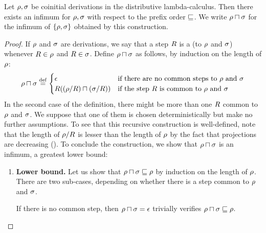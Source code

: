 \begin{proposition}
Let $\rho,\sigma$ be coinitial derivations in the distributive lambda-calculus.
Then there exists an infimum for $\rho,\sigma$ with respect to the prefix order $\sqsubseteq$.
We write $\rho \sqcap \sigma$ for the infimum of $\{\rho,\sigma\}$ obtained by this
construction.
\end{proposition}
\begin{proof}
If $\rho$ and $\sigma$ are derivations, we say that a step $R$
is a  (to $\rho$ and $\sigma$) whenever $R \in \rho$ and $R \in \sigma$.
Define $\rho \sqcap \sigma$ as follows,
by induction on the length of $\rho$:
\[
  \rho \sqcap \sigma \overset{\mathrm{def}}{=}
    \begin{cases}
    \epsilon & \text{if there are no common steps to $\rho$ and $\sigma$} \\
    R((\rho/R) \sqcap (\sigma/R)) & \text{if the step $R$ is common to $\rho$ and $\sigma$ } \\
    \end{cases}
\]
In the second case of the definition, there might be more than one $R$
common to $\rho$ and $\sigma$.
We suppose that one of them is chosen deterministically but make no further assumptions.
To see that this recursive construction is well-defined,
note that the length of $\rho/R$ is lesser than the length of $\rho$
by the fact that projections are decreasing ().
To conclude the construction, we show that $\rho \sqcap \sigma$ is an infimum, \ie a greatest lower bound:
\begin{enumerate}
\item {\bf Lower bound.}
  Let us show that $\rho \sqcap \sigma \sqsubseteq \rho$
  by induction on the length of $\rho$.
  There are two sub-cases, depending on whether
  there is a step common to $\rho$ and $\sigma$.

  If there is no common step,
  then $\rho \sqcap \sigma = \epsilon$
  trivially verifies $\rho \sqcap \sigma \sqsubseteq \rho$.


\end{enumerate}
\end{proof}
